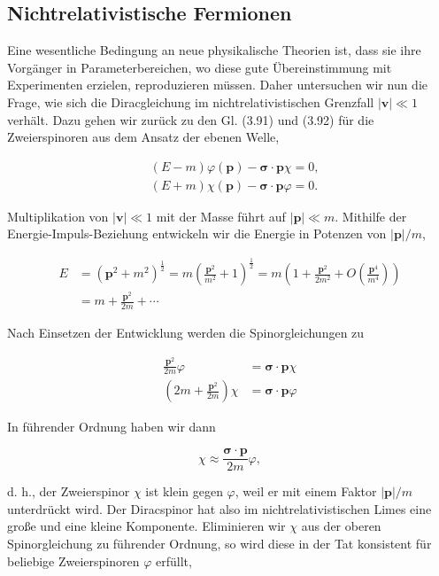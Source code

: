 \documentclass[10pt, letterpaper]{article}
\begin{document}
\pagebreak

\subsection{Nichtrelativistische Fermionen}
Eine wesentliche Bedingung an neue physikalische Theorien ist, dass sie ihre Vorgänger in Parameterbereichen, wo diese gute Übereinstimmung mit Experimenten erzielen, reproduzieren müssen. Daher untersuchen wir nun die Frage, wie sich die Diracgleichung im nichtrelativistischen Grenzfall $|\mathbf{v}| \ll 1$ verhält. Dazu gehen wir zurück zu den Gl. (3.91) und (3.92) für die Zweierspinoren aus dem Ansatz der ebenen Welle,

$$
\begin{aligned}
& (E-m) \varphi(\mathbf{p})-\boldsymbol{\sigma} \cdot \mathbf{p} \chi=0, \\
& (E+m) \chi(\mathbf{p})-\boldsymbol{\sigma} \cdot \mathbf{p} \varphi=0 .
\end{aligned}
$$

Multiplikation von $|\mathbf{v}| \ll 1$ mit der Masse führt auf $|\mathbf{p}| \ll m$. Mithilfe der Energie-Impuls-Beziehung entwickeln wir die Energie in Potenzen von $|\mathbf{p}| / m$,

$$
\begin{aligned}
E & =\left(\mathbf{p}^{2}+m^{2}\right)^{\frac{1}{2}}=m\left(\frac{\mathbf{p}^{2}}{m^{2}}+1\right)^{\frac{1}{2}}=m\left(1+\frac{\mathbf{p}^{2}}{2 m^{2}}+O\left(\frac{\mathbf{p}^{4}}{m^{4}}\right)\right) \\
& =m+\frac{\mathbf{p}^{2}}{2 m}+\cdots
\end{aligned}
$$

Nach Einsetzen der Entwicklung werden die Spinorgleichungen zu

$$
\begin{aligned}
\frac{\mathbf{p}^{2}}{2 m} \varphi & =\boldsymbol{\sigma} \cdot \mathbf{p} \chi \\
\left(2 m+\frac{\mathbf{p}^{2}}{2 m}\right) \chi & =\boldsymbol{\sigma} \cdot \mathbf{p} \varphi
\end{aligned}
$$

In führender Ordnung haben wir dann

$$
\chi \approx \frac{\boldsymbol{\sigma} \cdot \mathbf{p}}{2 m} \varphi,
$$

d. h., der Zweierspinor $\chi$ ist klein gegen $\varphi$, weil er mit einem Faktor $|\mathbf{p}| / m$ unterdrückt wird. Der Diracspinor hat also im nichtrelativistischen Limes eine große und eine kleine Komponente. Eliminieren wir $\chi$ aus der oberen Spinorgleichung zu führender Ordnung, so wird diese in der Tat konsistent für beliebige Zweierspinoren $\varphi$ erfüllt,
\end{document}
